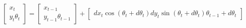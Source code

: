 \begin{equation}
\begin{bmatrix}
x_{t}\\
y_{t}
\theta_{t}
\end{bmatrix}=\begin{bmatrix}
x_{t-1}\\
y_{t-1}
\theta_{t-1}
\end{bmatrix}+\begin{bmatrix}
dx_t \cos(\theta_t+d\theta_t)
dy_{t}\sin(\theta_t+d\theta_t)
\theta_{t-1}+d\theta_t
\end{bmatrix}
\end{equation}




